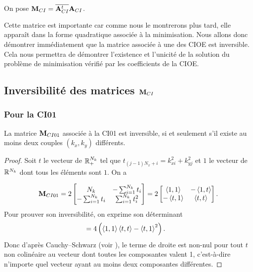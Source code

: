     \begin{defn}
      On pose \(\mathbf{M}_{CI}={\overline{\mathbf{A}_{CI}^t}}{\mathbf{A}_{CI}}\).
    \end{defn}

    Cette matrice est importante car comme nous le montrerons plus tard, elle apparaît dans la forme quadratique associée à la minimisation.
    Nous allons donc démontrer immédiatement que la matrice associée à une des CIOE est inversible.
    Cela nous permettra de démontrer l’existence et l'unicité de la solution du problème de minimisation vérifié par les coefficients de la CIOE.

  \subsection[Inversibilité des matrices Mci]{Inversibilité des matrices \(\mathbf{M}_{CI}\)}

    \subsubsection{Pour la CI01}

      \begin{prop}
        La matrice \({\mathbf{M}}_{CI01}\)
        associée à la CI01 est inversible, si et seulement s'il existe au moins deux couples \((k_{x},k_{y})\) différents.
      \end{prop}

      \begin{proof}
        Soit \(t\) le vecteur de \(\mathbb R_+^{N_{k}}\) tel que \(t_{(j-1)N_x+i} = k_{xi}^2 + k_{yj}^2\) et \(1\) le vecteur de \(\mathbb R^{N_{k}}\) dont tous les éléments sont \(1\). On a

        \begin{equation*}
          {\mathbf{M}}_{CI01} = 2\begin{bmatrix}
          N_{k} & -\sum_{i=1}^{N_{k}} t_i
          \\
          -\sum_{i=1}^{N_{k}} t_i & \sum_{i=1}^{N_{k}} t_i^2
          \end{bmatrix}
          = 2\begin{bmatrix}
          \left<{1},{1}\right> & -\left<{1},{t}\right>
          \\
          -\left<{t},{1}\right> & \left<{t},{t}\right>
          \end{bmatrix}.
        \end{equation*}
        Pour prouver son inversibilité, on exprime son déterminant 
        \begin{align*}
           &= 4\left( \left<{1},{1}\right>\left<{t},{t}\right> - \left<{t},{1}\right>^2\right).
        \end{align*}
        Donc d'après Cauchy–Schwarz (voir \cite[\href{https://dlmf.nist.gov/1.7\#E1}{eq.~1.7.1}]{dlmf_nist_2019}), le terme de droite est non-nul pour tout \(t\) non colinéaire au vecteur dont toutes les composantes valent 1, c'est-à-dire n'importe quel vecteur ayant au moins deux composantes différentes.
      \end{proof}

